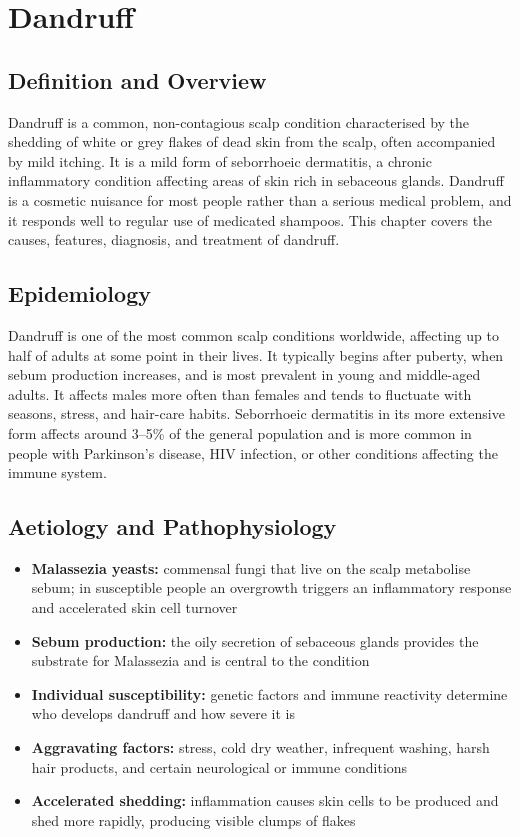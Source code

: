 \chapter{Dandruff}

\section*{Definition and Overview}
Dandruff is a common, non-contagious scalp condition characterised by the shedding of white or grey flakes of dead skin from the scalp, often accompanied by mild itching. It is a mild form of seborrhoeic dermatitis, a chronic inflammatory condition affecting areas of skin rich in sebaceous glands. Dandruff is a cosmetic nuisance for most people rather than a serious medical problem, and it responds well to regular use of medicated shampoos. This chapter covers the causes, features, diagnosis, and treatment of dandruff.

\section*{Epidemiology}
Dandruff is one of the most common scalp conditions worldwide, affecting up to half of adults at some point in their lives. It typically begins after puberty, when sebum production increases, and is most prevalent in young and middle-aged adults. It affects males more often than females and tends to fluctuate with seasons, stress, and hair-care habits. Seborrhoeic dermatitis in its more extensive form affects around 3--5\% of the general population and is more common in people with Parkinson's disease, HIV infection, or other conditions affecting the immune system.

\section*{Aetiology and Pathophysiology}
\begin{itemize}
    \item \textbf{Malassezia yeasts:} commensal fungi that live on the scalp metabolise sebum; in susceptible people an overgrowth triggers an inflammatory response and accelerated skin cell turnover
    \item \textbf{Sebum production:} the oily secretion of sebaceous glands provides the substrate for Malassezia and is central to the condition
    \item \textbf{Individual susceptibility:} genetic factors and immune reactivity determine who develops dandruff and how severe it is
    \item \textbf{Aggravating factors:} stress, cold dry weather, infrequent washing, harsh hair products, and certain neurological or immune conditions
    \item \textbf{Accelerated shedding:} inflammation causes skin cells to be produced and shed more rapidly, producing visible clumps of flakes
\end{itemize}

